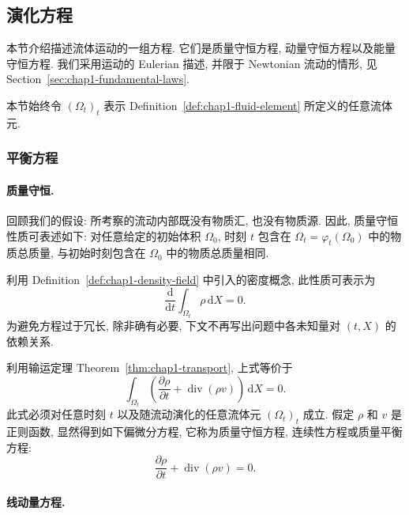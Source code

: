 \subsection{演化方程}
\label{sec:chap1-evolution-equations}

本节介绍描述流体运动的一组方程. 它们是质量守恒方程, 动量守恒方程以及能量守恒方程. 我们采用运动的 Eulerian 描述, 并限于 Newtonian 流动的情形, 见 Section~\ref{sec:chap1-fundamental-laws}.

本节始终令 $(\Omega_t)_t$ 表示 Definition~\ref{def:chap1-fluid-element} 所定义的任意流体元.

\subsubsection{平衡方程}
\label{subsec:chap1-balance-equations}

\paragraph{质量守恒.}
\label{subsec:chap1-mass-conservation}

回顾我们的假设: 所考察的流动内部既没有物质汇, 也没有物质源. 因此, 质量守恒性质可表述如下: 对任意给定的初始体积 $\Omega_0$, 时刻 $t$ 包含在 $\Omega_t=\varphi_t(\Omega_0)$ 中的物质总质量, 与初始时刻包含在 $\Omega_0$ 中的物质总质量相同.

利用 Definition~\ref{def:chap1-density-field} 中引入的密度概念, 此性质可表示为
\[
  \frac{\mathrm{d}}{\mathrm{d}t}\int_{\Omega_t}\rho\,\mathrm{d}X=0.
\]
为避免方程过于冗长, 除非确有必要, 下文不再写出问题中各未知量对 $(t,X)$ 的依赖关系.

利用输运定理 Theorem~\ref{thm:chap1-transport}, 上式等价于
\[
  \int_{\Omega_t}\left(\frac{\partial\rho}{\partial t}+\operatorname{div}(\rho v)\right)\,\mathrm{d}X=0.
\]
此式必须对任意时刻 $t$ 以及随流动演化的任意流体元 $(\Omega_t)_t$ 成立. 假定 $\rho$ 和 $v$ 是正则函数, 显然得到如下偏微分方程, 它称为质量守恒方程, 连续性方程或质量平衡方程:
\begin{equation}
\label{eq:chap1-mass-balance}
  \frac{\partial\rho}{\partial t}+\operatorname{div}(\rho v)=0.
\end{equation}

\paragraph{线动量方程.}
\label{subsec:chap1-linear-momentum}

